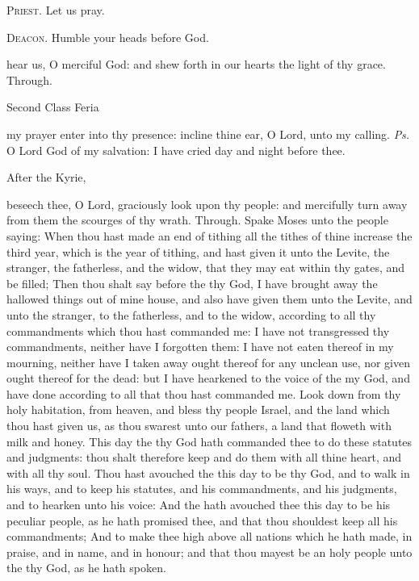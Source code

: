 \textsc{Priest.} Let us pray.\par
\textsc{Deacon.} Humble your heads before God.\par
{} hear us, O merciful God: and shew forth in our hearts the light of thy grace. Through.

\begin{inhead}
{Second Class Feria}
\end{inhead}

\properantiphonfix

\introit
{} my prayer enter into thy presence: incline thine ear, O Lord, unto my calling. \textit{Ps.} O Lord God of my salvation: I have cried day and night before thee.
\begin{rubric}
    After the Kyrie,
\end{rubric}
\collect
{} beseech thee, O Lord, graciously look upon thy people: and mercifully turn away from them the scourges of thy wrath. Through.
 Spake Moses unto the people saying: When thou hast made an end of tithing all the tithes of thine increase the third year, which is the year of tithing, and hast given it unto the Levite, the stranger, the fatherless, and the widow, that they may eat within thy gates, and be filled; Then thou shalt say before the  thy God, I have brought away the hallowed things out of mine house, and also have given them unto the Levite, and unto the stranger, to the fatherless, and to the widow, according to all thy commandments which thou hast commanded me: I have not transgressed thy commandments, neither have I forgotten them: I have not eaten thereof in my mourning, neither have I taken away ought thereof for any unclean use, nor given ought thereof for the dead: but I have hearkened to the voice of the  my God, and have done according to all that thou hast commanded me. Look down from thy holy habitation, from heaven, and bless thy people Israel, and the land which thou hast given us, as thou swarest unto our fathers, a land that floweth with milk and honey. This day the  thy God hath commanded thee to do these statutes and judgments: thou shalt therefore keep and do them with all thine heart, and with all thy soul. Thou hast avouched the  this day to be thy God, and to walk in his ways, and to keep his statutes, and his commandments, and his judgments, and to hearken unto his voice: And the  hath avouched thee this day to be his peculiar people, as he hath promised thee, and that thou shouldest keep all his commandments; And to make thee high above all nations which he hath made, in praise, and in name, and in honour; and that thou mayest be an holy people unto the  thy God, as he hath spoken.
